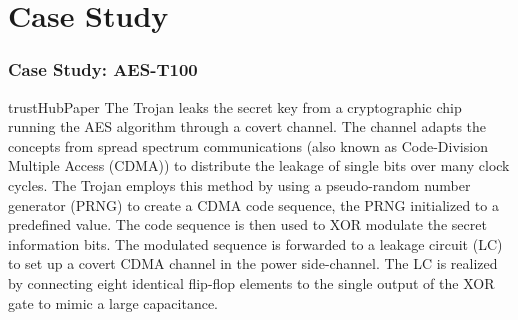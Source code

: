 \documentclass{beamer}
\begin{document}

\section{Case Study}
\begin{frame}
	\frametitle{Case Study: AES-T100}
	\begin{displaycquote}{trustHubPaper}
		The Trojan leaks the secret key from a cryptographic chip running the AES algorithm through a covert channel. The channel adapts the concepts from spread spectrum communications (also known as Code-Division Multiple Access (CDMA)) to distribute the leakage of single bits over many clock cycles. The Trojan employs this method by using a pseudo-random number generator (PRNG) to create a CDMA code sequence, the PRNG initialized to a predefined value. The code sequence is then used to XOR modulate the secret information bits. The modulated sequence is forwarded to a leakage circuit (LC) to set up a covert CDMA channel in the power side-channel. The LC is realized by connecting eight identical flip-flop elements to the single output of the XOR gate to mimic a large capacitance.
	\end{displaycquote}
\end{frame}
\end{document}
